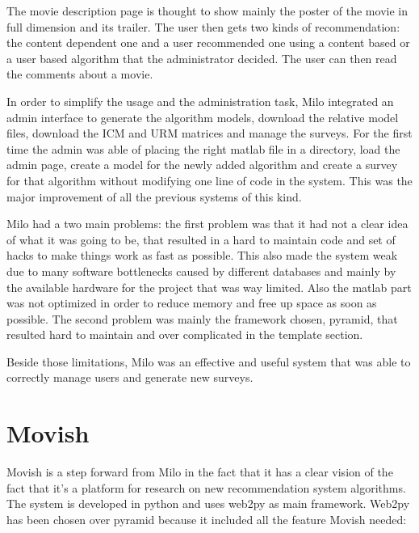 The movie description page is thought to show mainly the poster of the movie in full dimension and its trailer. The user then gets two kinds of recommendation: the content dependent one and a user recommended one using a content based or a user based algorithm that the administrator decided. The user can then read the comments about a movie.

In order to simplify the usage and the administration task, Milo integrated an admin interface to generate the algorithm models, download the relative model files, download the \ac{ICM} and \ac{URM} matrices and manage the surveys. For the first time the admin was able of placing the right matlab file in a directory, load the admin page, create a model for the newly added algorithm and create a survey for that algorithm without modifying one line of code in the system. This was the major improvement of all the previous systems of this kind.

Milo had a two main problems: the first problem was that it had not a clear idea of what it was going to be, that resulted in a hard to maintain code and set of hacks to make things work as fast as possible. This also made the system weak due to many software bottlenecks caused by different databases and mainly by the available hardware for the project that was way limited. Also the matlab part was not optimized in order to reduce memory and free up space as soon as possible. The second problem was mainly the framework chosen, pyramid, that resulted hard to maintain and over complicated in the template section.

Beside those limitations, Milo was an effective and useful system that was able to correctly manage users and generate new surveys.

\section{Movish}
\label{sec:movish}

Movish is a step forward from Milo in the fact that it has a clear vision of the fact that it's a platform for research on new recommendation system algorithms. The system is developed in python and uses web2py \cite{web2py} as main framework. Web2py has been chosen over pyramid because it included all the feature Movish needed:


